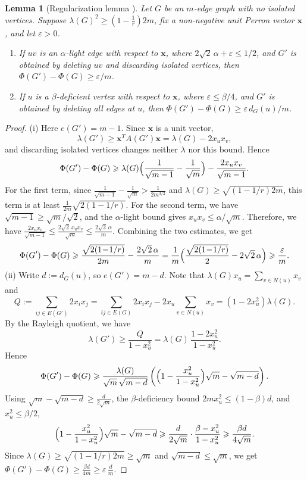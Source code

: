 \documentclass[11pt,a4paper]{article}
\newtheorem{lemma}[theorem]{Lemma}
\theoremstyle{definition}
\theoremstyle{plain}
\newcommand{\eps}{\varepsilon}
\renewcommand{\le}{\leqslant}
\renewcommand{\ge}{\geqslant}
\begin{document}
\begin{lemma}[Regularization lemma \cite{Niki2021, FLZ}] 
\label{lem:admissible}
Let  $G$ be an $m$-edge graph with no isolated vertices. Suppose $\lambda(G)^2\ge (1-\frac{1}{r}) 2m$, fix a
non-negative unit Perron vector $\bm{x}$, and let
$\eps >0$.
\begin{enumerate}[label=\textup{(\roman*)}]
\item If $uv$ is an $\alpha$-light  edge with respect to $\bm{x}$, where $2\sqrt2\,\alpha+\eps\le 
{1}/{2} $, 
and $G'$ is obtained by deleting $uv$ and
discarding isolated vertices, then
$\Phi(G')-\Phi(G)\ge \eps/m$.


\item If $u$ is a $\beta$-deficient vertex with respect to $\bm{x}$, where $\eps\le\beta/4$, and $G'$ is obtained by
deleting all edges at $u$, then
$\Phi(G')-\Phi(G)\ge\eps\,d_G(u)/m$.
\end{enumerate}
\end{lemma}


\begin{proof}
(i) Here $e(G')=m-1$. Since $\bm{x}$ is a unit vector,
\[
  \lambda(G')\ge \bm{x}^TA(G')\bm{x} =\lambda(G)-2x_ux_v,
\]
and discarding isolated vertices changes neither
$\lambda$ nor this bound. Hence
\[
  \Phi(G')-\Phi(G)
  \ge\lambda(G)\Bigl(\frac1{\sqrt{m-1}}
       -\frac1{\sqrt m}\Bigr)
   -\frac{2x_ux_v}{\sqrt{m-1}}.
\]
For the first term, since $  
\frac1{\sqrt{m-1}}-\frac1{\sqrt m} > \frac1{2m^{3/2}}$ 
and $\lambda(G)\ge\sqrt{(1-1/r)2m}$, this term is at
least $\frac{1}{2m}\sqrt{2(1-1/r)}$. 
For the second term, we have  
$\sqrt{m-1}\ge\sqrt m/\sqrt2$, and the
$\alpha$-light bound gives $x_ux_v\le\alpha/\sqrt m$.
Therefore, we have $  \frac{2x_ux_v}{\sqrt{m-1}}
  \le\frac{2\sqrt2\,x_ux_v}{\sqrt m}
  \le\frac{2\sqrt2\,\alpha}{m}$. 
Combining the two estimates, we get 
\[
  \Phi(G')-\Phi(G)
  \ge\frac{\sqrt{2(1\!-\!1/r)}}{2m}
     -\frac{2\sqrt2\,\alpha}{m}
  =\frac1m\Bigl(\frac{\sqrt{2(1\!-\!1/r)}}{2}
                -2\sqrt2\,\alpha\Bigr)
  \ge\frac{\eps}{m}. 
\]
(ii) Write $d:=d_G(u)$, so
$e(G')=m -d$. Note that $\lambda(G)x_{u} = \sum_{v\in N(u)} x_v$ and 
$$Q:=\sum_{ij\in E(G')}2x_ix_j 
= \sum_{ij\in E(G)}2x_ix_j - 2x_u \sum_{v\in N(u)} x_v 
=(1-2x_u^2)\lambda(G).$$ By
the Rayleigh quotient, we have 
\[
  \lambda(G')\ge\frac{Q}{1-x_u^2}
  =\lambda(G)\,\frac{1-2x_u^2}{1-x_u^2}.
\]
Hence
\[
  \Phi(G')-\Phi(G)
  \ge\frac{\lambda(G)}{\sqrt m\,\sqrt{m-d}}
   \left(\Bigl(1-\frac{x_u^2}{1-x_u^2}\Bigr)\sqrt m
        -\sqrt{m-d}\right).
\]
Using $\sqrt m-\sqrt{m-d}\ge \frac{d}{2\sqrt m}$, the
$\beta$-deficiency bound $2m x_u^2\le(1-\beta)d$, and
$x_u^2\le\beta/2$,
\[
  \Bigl(1-\frac{x_u^2}{1-x_u^2}\Bigr)\sqrt m-\sqrt{m-d}
  \ge\frac{d}{2\sqrt m}\cdot\frac{\beta- x_u^2}{1-x_u^2}
  \ge\frac{\beta d}{4\sqrt m}.
\]
Since $\lambda(G)\ge\sqrt{(1\!-\!1/r)2m}\ge\sqrt m$ and
$\sqrt{m-d}\le\sqrt m$, we get 
$ \Phi(G')-\Phi(G)\ge\frac{\beta d}{4m}
  \ge\eps\,\frac dm$. 
\end{proof}
\end{document}
